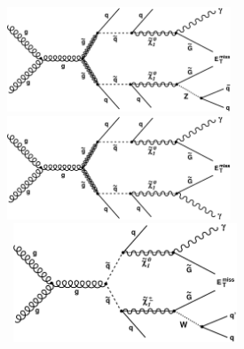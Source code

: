 \vspace{5mm}
\begin{minipage}{0.88\linewidth}
\begin{center}
\centering
\mbox{\includegraphics[height=0.7\textwidth, width=0.5\textwidth]{THESISPLOTS/SinglePhoton_gluino.pdf} \quad \quad
\includegraphics[height=0.7\textwidth, width=0.5\textwidth]{THESISPLOTS/Diphoton_gluino.pdf}} \\
\hspace{0.5cm}
\mbox{   \includegraphics[height=0.7\textwidth, width=0.5\textwidth]{THESISPLOTS/SinglePhoton_squark.pdf}\quad \quad
}
\end{center}
\end{minipage}
